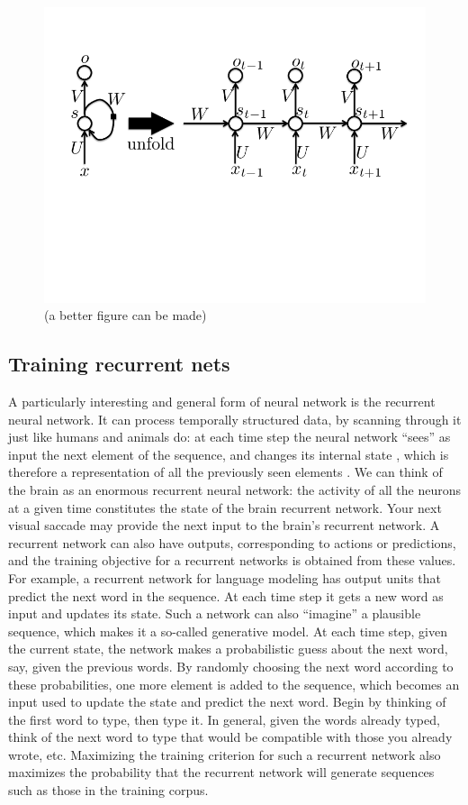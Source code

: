\documentclass{article} %
\begin{document}
\begin{figure}[H]
\includegraphics{fig-hidden-recurrence-rnn.png}
\caption{(a better figure can be made)}
\end{figure}

\subsection{Training recurrent nets}

A particularly interesting and general form of neural network is the
recurrent neural network. It can process temporally structured data, by
scanning through it just like humans and animals do: at each time step the
neural network “sees” as input the next element of the sequence, and
changes its internal state , which is therefore a representation of all the
previously seen elements . We can think of the brain as an enormous
recurrent neural network: the activity of all the neurons at a given time
constitutes the state of the brain recurrent network. Your next visual
saccade may provide the next input to the brain’s recurrent network. A
recurrent network can also have outputs, corresponding to actions or
predictions, and the training objective for a recurrent networks is
obtained from these values. For example, a recurrent network for language
modeling has output units that predict the next word in the sequence. At
each time step it gets a new word as input and updates its state. Such a
network can also “imagine” a plausible sequence, which makes it a so-called
generative model.  At each time step, given the current state, the network
makes a probabilistic guess about the next word, say, given the previous
words. By randomly choosing the next word according to these probabilities,
one more element is added to the sequence, which becomes an input used to
update the state and predict the next word. Begin by thinking of the first
word to type, then type it. In general, given the words already typed,
think of the next word to type that would be compatible with those you
already wrote, etc. Maximizing the training criterion for such a recurrent
network also maximizes the probability that the recurrent network will
generate sequences such as those in the training corpus.
\end{document}
